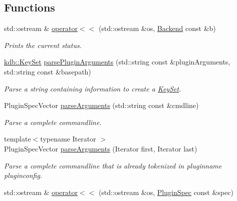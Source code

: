\subsection*{Functions}
\begin{DoxyCompactItemize}
\item 
std\+::ostream \& \hyperlink{namespacekdb_1_1tools_a10b59213ee542e33c7ecc481d4476a79}{operator$<$$<$} (std\+::ostream \&os, \hyperlink{classkdb_1_1tools_1_1Backend}{Backend} const \&b)
\begin{DoxyCompactList}\small\item\em Prints the current status. \end{DoxyCompactList}\item 
\hyperlink{classkdb_1_1KeySet}{kdb\+::\+Key\+Set} \hyperlink{namespacekdb_1_1tools_ad4fdf9477ede38a219b02a7442965f6d}{parse\+Plugin\+Arguments} (std\+::string const \&plugin\+Arguments, std\+::string const \&basepath)
\begin{DoxyCompactList}\small\item\em Parse a string containing information to create a \hyperlink{classkdb_1_1KeySet}{Key\+Set}. \end{DoxyCompactList}\item 
Plugin\+Spec\+Vector \hyperlink{namespacekdb_1_1tools_a3c08f8fdabc7002ff497b247cba6bb21}{parse\+Arguments} (std\+::string const \&cmdline)
\begin{DoxyCompactList}\small\item\em Parse a complete commandline. \end{DoxyCompactList}\item 
{\footnotesize template$<$typename Iterator $>$ }\\Plugin\+Spec\+Vector \hyperlink{namespacekdb_1_1tools_ab7ffe14ed9cab32c07ddb55a8a65973a}{parse\+Arguments} (Iterator first, Iterator last)
\begin{DoxyCompactList}\small\item\em Parse a complete commandline that is already tokenized in pluginname pluginconfig. \end{DoxyCompactList}\item 
\hypertarget{namespacekdb_1_1tools_a7a731fb15351e62222ae8763ca6aa876}{std\+::ostream \& \hyperlink{namespacekdb_1_1tools_a7a731fb15351e62222ae8763ca6aa876}{operator$<$$<$} (std\+::ostream \&os, \hyperlink{classkdb_1_1tools_1_1PluginSpec}{Plugin\+Spec} const \&spec)}\label{namespacekdb_1_1tools_a7a731fb15351e62222ae8763ca6aa876}


\end{DoxyCompactItemize}
